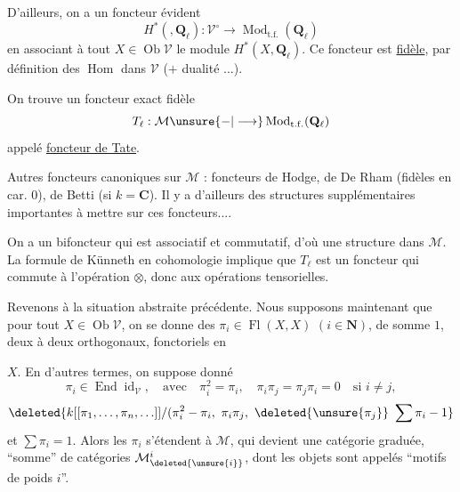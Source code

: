 D'ailleurs, on a un foncteur évident
\[
H^{*}(,\mathbf Q_\ell):\mathcal V^\circ\longrightarrow\operatorname{Mod}_{\mathrm{t.f.}}(\mathbf Q_\ell)
\]
en associant à tout $X\in\operatorname{Ob}\mathcal V$ le module $H^{*}(X,\mathbf Q_\ell)$. Ce foncteur est \uline{fidèle}, par définition  des $\operatorname{Hom}$ dans $\mathcal V$ ($+$ dualité ...).

On trouve un foncteur exact fidèle 
\[
T_\ell:\mathcal M\unsure{\mathbin{-}|\longrightarrow}\operatorname{Mod}_{\mathrm{t.f.}}(\mathbf Q_\ell)
\]
appelé \uline{foncteur de Tate}.

Autres foncteurs canoniques sur $\mathcal M$ : foncteurs de Hodge, de  De Rham (fidèles en car. $0$), de Betti (si $k=\mathbf C$). Il y a d'ailleurs des structures supplémentaires importantes à mettre sur ces foncteurs....

On a un bifoncteur
qui est associatif et commutatif, d'où une structure  dans $\mathcal M$.
La formule de Künneth en cohomologie implique que $T_\ell$ est un foncteur qui commute  à l'opération $\otimes$, donc aux opérations tensorielles.


Revenons à la situation abstraite précédente. Nous supposons maintenant que pour tout $X\in\operatorname{Ob}\mathcal V$, on se donne des  $\pi_i\in\operatorname{Fl}(X,X)$ $(i\in\mathbf N)$,  de somme $1$, deux à deux orthogonaux, fonctoriels en

$X$. En d'autres termes, on suppose donné 
\[
\pi_i\in\operatorname{End}\operatorname{id}_{\mathcal V},\quad\text{avec}\quad
\pi_i^2=\pi_i,\quad\pi_i\pi_j=\pi_j\pi_i=0\quad\text{si }i\ne j,
\]
\[
\deleted{k[[\pi_1,\ldots,\pi_n,\ldots]]/(\pi_i^2-\pi_i,\ \pi_i\pi_j,\ \deleted{\unsure{\pi_j}}\ \sum\pi_i-1}
\]
et $\sum\pi_i=1$. 
Alors les $\pi_i$ s'étendent à $\mathcal M$, qui devient une catégorie graduée,  ``somme'' de catégories $\mathcal M^{i}_{\deleted{\unsure{i}}}$, dont les objets sont appelés ``motifs de poids $i$''.

